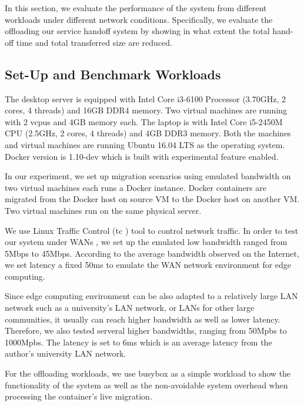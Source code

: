 
In this section, we evaluate the performance of the system from different workloads under different network conditions. 
Specifically, we evaluate the offloading our service handoff system by showing in what extent the total hand-off time and total transferred size are reduced.

\subsection{Set-Up and Benchmark Workloads}

The desktop server is equipped with Intel Core i3-6100 Processor (3.70GHz, 2 cores, 4 threads) and 16GB DDR4 memory. Two virtual machines are running with 2 vcpus and 4GB memory each.
The laptop is with Intel Core i5-2450M CPU (2.5GHz, 2 cores, 4 threads) and 4GB DDR3 memory. Both the machines and virtual machines are running Ubuntu 16.04 LTS as the operating system. Docker version is 1.10-dev which is built with experimental feature enabled.

In our experiment, we set up migration scenarios using 
emulated bandwidth on two virtual machines each runs a Docker instance.
Docker containers are migrated from the Docker host on source VM to the Docker host on another VM. 
Two virtual machines run on the same physical server. 

We use Linux Traffic Control (tc\cite{tc} )  tool to control network traffic. In order to test our system under WANs , we set up the emulated low bandwidth ranged from 5Mbps to 45Mbps. According to the average bandwidth observed on the Internet\cite{internet2014state}, we set  latency a fixed 50ms to emulate the WAN network environment for edge computing.

Since edge computing environment can be also adapted to a relatively large LAN network such as a university's LAN network, or LANs for other large communities, it usually can reach higher bandwidth as well as lower latency. Therefore, we also tested serveral higher bandwidths, ranging from 50Mpbs to 1000Mpbs. The latency is set to 6ms which is an average latency from the author's university LAN network.

For the offloading workloads, we use busybox as a simple workload to show the functionality of the system as well as the non-avoidable system overhead when processing the container's live migration.  

